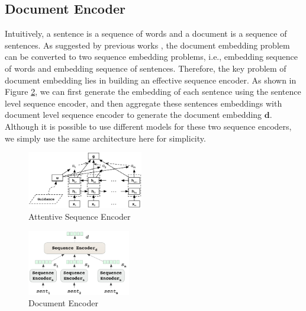 \subsection{Document Encoder}
\label{sec_doc_encoder}
Intuitively, a sentence is a sequence of words and a document is a sequence of sentences. As suggested by previous works \cite{tang2015document,yang2016hierarchical}, the document embedding problem can be converted to two sequence embedding problems, i.e., embedding sequence of words and embedding sequence of sentences. Therefore, the key problem of document embedding lies in building an effective sequence encoder. As shown in Figure \ref{fig_doc_encoder}, we can first generate the embedding of each sentence using the sentence level sequence encoder, and then aggregate these sentences embeddings with document level sequence encoder to generate the document embedding $\mathbf{d}$. Although it is possible to use different models for these two sequence encoders, we simply use the same architecture here for simplicity.

\begin{figure}[htbp]
\begin{center}
\includegraphics[width=0.45\textwidth]{figures/attentive_seq_encoder.png}	
\caption{Attentive Sequence Encoder}
\label{fig_seq_encoder}
\end{center}
\end{figure}

\begin{figure}[htbp]
\begin{center}
\includegraphics[width=0.4\textwidth]{figures/document_encoder.png}	
\caption{Document Encoder}
\label{fig_doc_encoder}
\end{center}
\end{figure}

